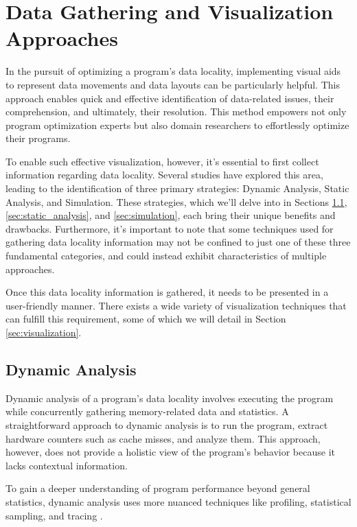 \section{Data Gathering and Visualization Approaches}\label{sec:methods}
In the pursuit of optimizing a program's data locality, implementing visual aids to represent data movements and data layouts can be particularly helpful. This approach enables quick and effective identification of data-related issues, their comprehension, and ultimately, their resolution. This method empowers not only program optimization experts but also domain researchers to effortlessly optimize their programs.

To enable such effective visualization, however, it's essential to first collect information regarding data locality. Several studies have explored this area, leading to the identification of three primary strategies: Dynamic Analysis, Static Analysis, and Simulation. These strategies, which we'll delve into in Sections \ref{sec:dynamic_analysis}, \ref{sec:static_analysis}, and \ref{sec:simulation}, each bring their unique benefits and drawbacks. Furthermore, it's important to note that some techniques used for gathering data locality information may not be confined to just one of these three fundamental categories, and could instead exhibit characteristics of multiple approaches.

Once this data locality information is gathered, it needs to be presented in a user-friendly manner. There exists a wide variety of visualization techniques that can fulfill this requirement, some of which we will detail in Section \ref{sec:visualization}.

\subsection{Dynamic Analysis}\label{sec:dynamic_analysis}
Dynamic analysis of a program's data locality involves executing the program while concurrently gathering memory-related data and statistics. A straightforward approach to dynamic analysis is to run the program, extract hardware counters such as cache misses, and analyze them. This approach, however, does not provide a holistic view of the program's behavior because it lacks contextual information.

To gain a deeper understanding of program performance beyond general statistics, dynamic analysis uses more nuanced techniques like profiling, statistical sampling, and tracing \cite{shende1999profiling,itzkowitz2003memory,gimenez2017memaxes,mckinley1999quantifying,adhianto2010hpctoolkit}.

